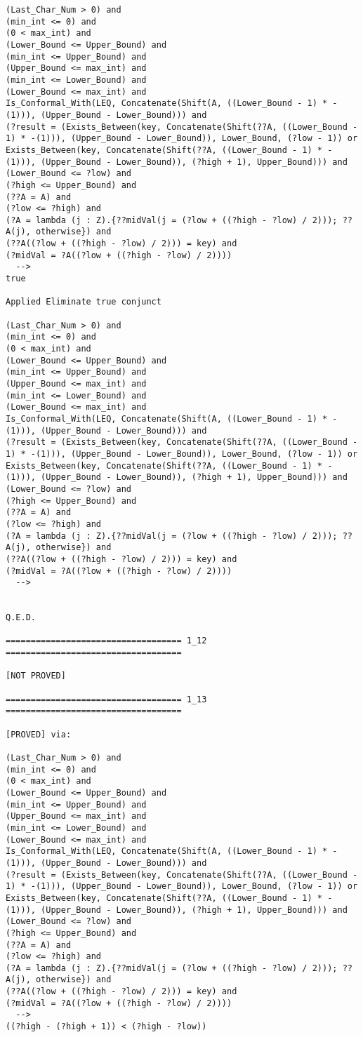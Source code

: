\begin{lstlisting}[language=resolve]
(Last_Char_Num > 0) and
(min_int <= 0) and
(0 < max_int) and
(Lower_Bound <= Upper_Bound) and
(min_int <= Upper_Bound) and
(Upper_Bound <= max_int) and
(min_int <= Lower_Bound) and
(Lower_Bound <= max_int) and
Is_Conformal_With(LEQ, Concatenate(Shift(A, ((Lower_Bound - 1) * -(1))), (Upper_Bound - Lower_Bound))) and
(?result = (Exists_Between(key, Concatenate(Shift(??A, ((Lower_Bound - 1) * -(1))), (Upper_Bound - Lower_Bound)), Lower_Bound, (?low - 1)) or Exists_Between(key, Concatenate(Shift(??A, ((Lower_Bound - 1) * -(1))), (Upper_Bound - Lower_Bound)), (?high + 1), Upper_Bound))) and
(Lower_Bound <= ?low) and
(?high <= Upper_Bound) and
(??A = A) and
(?low <= ?high) and
(?A = lambda (j : Z).{??midVal(j = (?low + ((?high - ?low) / 2))); ??A(j), otherwise}) and
(??A((?low + ((?high - ?low) / 2))) = key) and
(?midVal = ?A((?low + ((?high - ?low) / 2))))
  -->
true

Applied Eliminate true conjunct

(Last_Char_Num > 0) and
(min_int <= 0) and
(0 < max_int) and
(Lower_Bound <= Upper_Bound) and
(min_int <= Upper_Bound) and
(Upper_Bound <= max_int) and
(min_int <= Lower_Bound) and
(Lower_Bound <= max_int) and
Is_Conformal_With(LEQ, Concatenate(Shift(A, ((Lower_Bound - 1) * -(1))), (Upper_Bound - Lower_Bound))) and
(?result = (Exists_Between(key, Concatenate(Shift(??A, ((Lower_Bound - 1) * -(1))), (Upper_Bound - Lower_Bound)), Lower_Bound, (?low - 1)) or Exists_Between(key, Concatenate(Shift(??A, ((Lower_Bound - 1) * -(1))), (Upper_Bound - Lower_Bound)), (?high + 1), Upper_Bound))) and
(Lower_Bound <= ?low) and
(?high <= Upper_Bound) and
(??A = A) and
(?low <= ?high) and
(?A = lambda (j : Z).{??midVal(j = (?low + ((?high - ?low) / 2))); ??A(j), otherwise}) and
(??A((?low + ((?high - ?low) / 2))) = key) and
(?midVal = ?A((?low + ((?high - ?low) / 2))))
  -->


Q.E.D.

=================================== 1_12 ===================================

[NOT PROVED]

=================================== 1_13 ===================================

[PROVED] via:

(Last_Char_Num > 0) and
(min_int <= 0) and
(0 < max_int) and
(Lower_Bound <= Upper_Bound) and
(min_int <= Upper_Bound) and
(Upper_Bound <= max_int) and
(min_int <= Lower_Bound) and
(Lower_Bound <= max_int) and
Is_Conformal_With(LEQ, Concatenate(Shift(A, ((Lower_Bound - 1) * -(1))), (Upper_Bound - Lower_Bound))) and
(?result = (Exists_Between(key, Concatenate(Shift(??A, ((Lower_Bound - 1) * -(1))), (Upper_Bound - Lower_Bound)), Lower_Bound, (?low - 1)) or Exists_Between(key, Concatenate(Shift(??A, ((Lower_Bound - 1) * -(1))), (Upper_Bound - Lower_Bound)), (?high + 1), Upper_Bound))) and
(Lower_Bound <= ?low) and
(?high <= Upper_Bound) and
(??A = A) and
(?low <= ?high) and
(?A = lambda (j : Z).{??midVal(j = (?low + ((?high - ?low) / 2))); ??A(j), otherwise}) and
(??A((?low + ((?high - ?low) / 2))) = key) and
(?midVal = ?A((?low + ((?high - ?low) / 2))))
  -->
((?high - (?high + 1)) < (?high - ?low))


\end{lstlisting}
